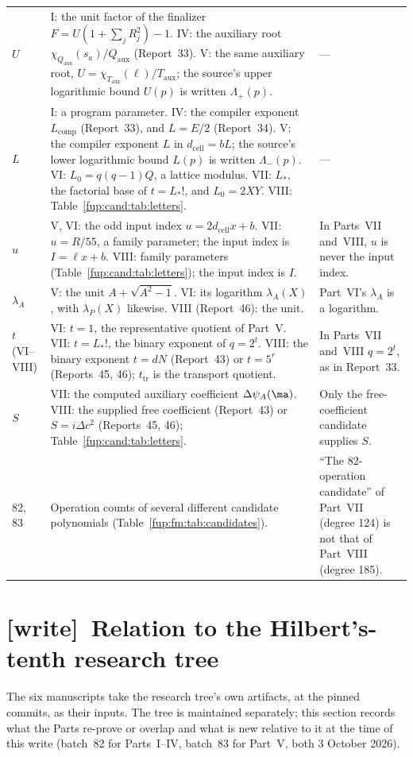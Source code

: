 \documentclass[11pt,letterpaper]{article}
\theoremstyle{definition}\newtheorem{definition}[theorem]{Definition}
\theoremstyle{remark}\newtheorem{remark}[theorem]{Remark}
\newcommand{\Qa}{Q_{\mathrm{aux}}}
\newcommand{\dcell}{d_{\mathrm{cell}}}
\newcommand{\Taux}{T_{\mathrm{aux}}}\newcommand{\yaux}{y_{\mathrm{aux}}}
\newcommand{\wtag}{\textup{[write]}}
\begin{document}
{\begin{longtable}{@{}p{}p{}p{}@{}}
$U$ & I: the unit factor of the finalizer $F=U(1+\sum_jR_j^2)-1$. IV: the auxiliary root $\chi_{\Qa}(s_a)/\Qa$ (Report~33). V: the same auxiliary root, $U=\chi_{\Taux}(\ell)/\Taux$; the source's upper logarithmic bound $U(p)$ is written $\Lambda_+(p)$. & ---\\
$L$ & I: a program parameter. IV: the compiler exponent $L_{\mathrm{comp}}$ (Report~33), and $L=E/2$ (Report~34). V: the compiler exponent $L$ in $\dcell=bL$; the source's lower logarithmic bound $L(p)$ is written $\Lambda_-(p)$. VI: $L_0=q(q-1)Q$, a lattice modulus. VII: $L_*$, the factorial base of $t=L_*!$, and $L_0=2XY$. VIII: Table~\ref{fup:cand:tab:letters}. & ---\\
$u$ & V, VI: the odd input index $u=2\dcell x+b$. VII: $u=R/55$, a family parameter; the input index is $I=\ell x+b$. VIII: family parameters (Table~\ref{fup:cand:tab:letters}); the input index is $I$. & In Parts~VII and~VIII, $u$ is never the input index.\\
$\lambda_A$ & V: the unit $A+\sqrt{A^2-1}$. VI: its logarithm $\lambda_A(X)$, with $\lambda_P(X)$ likewise. VIII (Report~46): the unit. & Part~VI's $\lambda_A$ is a logarithm.\\
$t$ (VI--VIII) & VI: $t=1$, the representative quotient of Part~V. VII: $t=L_*!$, the binary exponent of $q=2^t$. VIII: the binary exponent $t=dN$ (Report~43) or $t=5^r$ (Reports~45, 46); $t_{\mathrm{tr}}$ is the transport quotient. & In Parts~VII and~VIII $q=2^t$, as in Report~33.\\
$S$ & VII: the computed auxiliary coefficient $\Delta\psi_A(\ma)$. VIII: the supplied free coefficient (Report~43) or $S=i\Delta c^2$ (Reports~45, 46); Table~\ref{fup:cand:tab:letters}. & Only the free-coefficient candidate supplies $S$.\\
82, 83 & Operation counts of several different candidate polynomials (Table~\ref{fup:fm:tab:candidates}). & ``The 82-operation candidate'' of Part~VII (degree 124) is not that of Part~VIII (degree 185).\\\bottomrule
\end{longtable}
}

\section{\wtag\ Relation to the Hilbert's-tenth research tree}\label{fup:fm:sec:tree}
The six manuscripts take the research tree's own artifacts, at the pinned commits, as their inputs. The tree is maintained separately; this section records what the Parts re-prove or overlap and what is new relative to it at the time of this write (batch~82 for Parts~I--IV, batch~83 for Part~V, both 3 October 2026).
\end{document}

